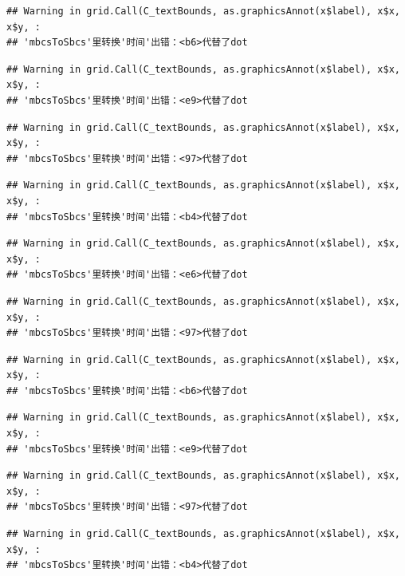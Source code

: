 \documentclass[
]{article}
\begin{document}
\begin{verbatim}
## Warning in grid.Call(C_textBounds, as.graphicsAnnot(x$label), x$x, x$y, :
## 'mbcsToSbcs'里转换'时间'出错：<b6>代替了dot
\end{verbatim}

\begin{verbatim}
## Warning in grid.Call(C_textBounds, as.graphicsAnnot(x$label), x$x, x$y, :
## 'mbcsToSbcs'里转换'时间'出错：<e9>代替了dot
\end{verbatim}

\begin{verbatim}
## Warning in grid.Call(C_textBounds, as.graphicsAnnot(x$label), x$x, x$y, :
## 'mbcsToSbcs'里转换'时间'出错：<97>代替了dot
\end{verbatim}

\begin{verbatim}
## Warning in grid.Call(C_textBounds, as.graphicsAnnot(x$label), x$x, x$y, :
## 'mbcsToSbcs'里转换'时间'出错：<b4>代替了dot
\end{verbatim}

\begin{verbatim}
## Warning in grid.Call(C_textBounds, as.graphicsAnnot(x$label), x$x, x$y, :
## 'mbcsToSbcs'里转换'时间'出错：<e6>代替了dot
\end{verbatim}

\begin{verbatim}
## Warning in grid.Call(C_textBounds, as.graphicsAnnot(x$label), x$x, x$y, :
## 'mbcsToSbcs'里转换'时间'出错：<97>代替了dot
\end{verbatim}

\begin{verbatim}
## Warning in grid.Call(C_textBounds, as.graphicsAnnot(x$label), x$x, x$y, :
## 'mbcsToSbcs'里转换'时间'出错：<b6>代替了dot
\end{verbatim}

\begin{verbatim}
## Warning in grid.Call(C_textBounds, as.graphicsAnnot(x$label), x$x, x$y, :
## 'mbcsToSbcs'里转换'时间'出错：<e9>代替了dot
\end{verbatim}

\begin{verbatim}
## Warning in grid.Call(C_textBounds, as.graphicsAnnot(x$label), x$x, x$y, :
## 'mbcsToSbcs'里转换'时间'出错：<97>代替了dot
\end{verbatim}

\begin{verbatim}
## Warning in grid.Call(C_textBounds, as.graphicsAnnot(x$label), x$x, x$y, :
## 'mbcsToSbcs'里转换'时间'出错：<b4>代替了dot
\end{verbatim}
\end{document}
